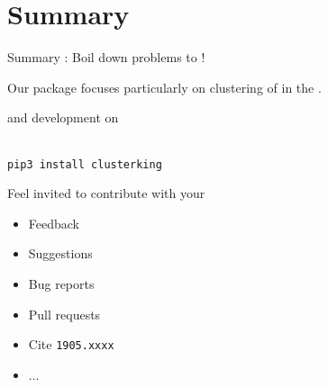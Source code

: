 \section{Summary}
\begin{frame}{Summary}
%	
%	
%	
	: Boil down  problems to !
	
	\bigskip
	Our package focuses particularly on clustering of  in the .
	
	\bigskip
	 and development on
	\\
	\vspace{-0.6cm}
	
	{}\\[-0.25cm]
    {\color{purple}\texttt{pip3 install clusterking}}
	
	\vspace{0.3cm}
	Feel invited to contribute with your
	\begin{itemize}
		\item Feedback
		\item Suggestions
		\item Bug reports
		\item Pull requests
        \item Cite \texttt{1905.xxxx}
		\item ...
	\end{itemize}
	\end{frame}